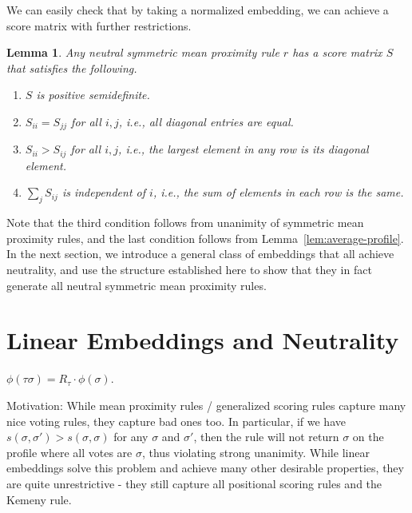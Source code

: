 \documentclass[10pt,letterpaper]{article}
\newtheorem{lemma}{Lemma}
\newenvironment{definition}[1][Definition]{\begin{trivlist}
\item[\hskip \labelsep {\bfseries #1}]}{\end{trivlist}}
\begin{document}
We can easily check that by taking a normalized embedding, we can achieve a score matrix with further restrictions.
\begin{lemma}
Any neutral symmetric mean proximity rule $r$ has a score matrix $S$ that satisfies the following.
\begin{enumerate}
\item $S$ is positive semidefinite.
\item $S_{ii} = S_{jj}$ for all $i,j$, i.e., all diagonal entries are equal.
\item $S_{ii} > S_{ij}$ for all $i,j$, i.e., the largest element in any row is its diagonal element.
\item $\sum_j S_{ij}$ is independent of $i$, i.e., the sum of elements in each row is the same.
\end{enumerate}
\end{lemma}
Note that the third condition follows from unanimity of symmetric mean proximity rules, and the last condition follows from Lemma~\ref{lem:average-profile}. In the next section, we introduce a general class of embeddings that all achieve neutrality, and use the structure established here to show that they in fact generate all neutral symmetric mean proximity rules.



\section{Linear Embeddings and Neutrality}

\begin{definition}[Linear Embeddings]
$\phi(\tau \sigma) = R_{\tau} \cdot \phi(\sigma)$. 
\end{definition}

Motivation: While mean proximity rules / generalized scoring rules capture many nice voting rules, they capture bad ones too. In particular, if we have $s(\sigma,\sigma') > s(\sigma,\sigma)$ for any $\sigma$ and $\sigma'$, then the rule will not return $\sigma$ on the profile where all votes are $\sigma$, thus violating strong unanimity. While linear embeddings solve this problem and achieve many other desirable properties, they are quite unrestrictive - they still capture all positional scoring rules and the Kemeny rule.
\end{document}
